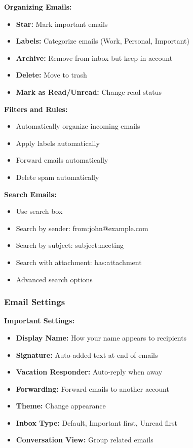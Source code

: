 \documentclass[12pt,a4paper]{article}
\begin{document}
\textbf{Organizing Emails:}
\begin{itemize}
    \item \textbf{Star:} Mark important emails
    \item \textbf{Labels:} Categorize emails (Work, Personal, Important)
    \item \textbf{Archive:} Remove from inbox but keep in account
    \item \textbf{Delete:} Move to trash
    \item \textbf{Mark as Read/Unread:} Change read status
\end{itemize}

\textbf{Filters and Rules:}
\begin{itemize}
    \item Automatically organize incoming emails
    \item Apply labels automatically
    \item Forward emails automatically
    \item Delete spam automatically
\end{itemize}

\textbf{Search Emails:}
\begin{itemize}
    \item Use search box
    \item Search by sender: from:john@example.com
    \item Search by subject: subject:meeting
    \item Search with attachment: has:attachment
    \item Advanced search options
\end{itemize}

\subsubsection{Email Settings}

\textbf{Important Settings:}
\begin{itemize}
    \item \textbf{Display Name:} How your name appears to recipients
    \item \textbf{Signature:} Auto-added text at end of emails
    \item \textbf{Vacation Responder:} Auto-reply when away
    \item \textbf{Forwarding:} Forward emails to another account
    \item \textbf{Theme:} Change appearance
    \item \textbf{Inbox Type:} Default, Important first, Unread first
    \item \textbf{Conversation View:} Group related emails
\end{itemize}
\end{document}
